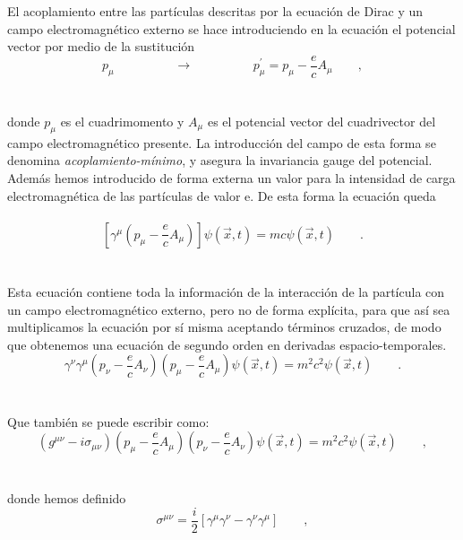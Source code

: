 \documentclass[11pt,letterpaper]{article}     %
\begin{document}
El acoplamiento entre las partículas descritas por la ecuación de Dirac y un campo electromagnético externo se hace introduciendo en la ecuación el potencial vector  por medio de la sustitución
\begin{equation} \label{eq:60}
p_\mu \hspace{2cm} \rightarrow \hspace{2cm} p^{'}_\mu=p_\mu - \frac{e}{c} A_\mu \qquad ,
\end{equation} \\ \\
donde $p_\mu$ es el cuadrimomento y $A_\mu$ es el potencial vector del cuadrivector del campo electromagnético presente. La introducción del campo de esta forma se denomina \textit{acoplamiento-mínimo}, y asegura la invariancia gauge del potencial. Además hemos introducido de forma externa un valor para la intensidad de carga electromagnética de las partículas de valor e. De esta forma la ecuación queda \\ \\
\begin{equation} \label{eq:61}
\left[\gamma^\mu \left(p_\mu - \frac{e}{c}A_\mu \right)\right]\psi(\vec{x},t)=mc\psi(\vec{x},t) \qquad .
\end{equation} \\ \\
Esta ecuación contiene toda la información de la interacción de la partícula con un campo electromagnético externo, pero no de forma explícita, para que así sea multiplicamos la ecuación por sí misma aceptando términos cruzados, de modo que obtenemos una ecuación de segundo orden en derivadas espacio-temporales.
\begin{equation} \label{eq:62}
\gamma^\nu \gamma^\mu \left(p_\nu - \frac{e}{c}A_\nu \right)\left(p_\mu - \frac{e}{c}A_\mu \right)\psi(\vec{x},t)=m^2c^2 \psi(\vec{x},t) \qquad .
\end{equation} \\ \\
Que también se puede escribir como:
\begin{equation} \label{eq:63}
(g^{\mu \nu}-i\sigma_{\mu \nu})\left(p_\mu - \frac{e}{c}A_\mu \right) \left(p_\nu - \frac{e}{c}A_\nu \right)\psi(\vec{x},t)=m^2c^2\psi(\vec{x},t) \qquad ,
\end{equation} \\ \\
donde hemos definido
\begin{equation} \label{eq:64}
\sigma^{\mu\nu}= \frac{i}{2}\left[\gamma^\mu \gamma^\nu - \gamma^\nu \gamma^\mu \right] \qquad , {}
\end{equation} \\
\end{document}
